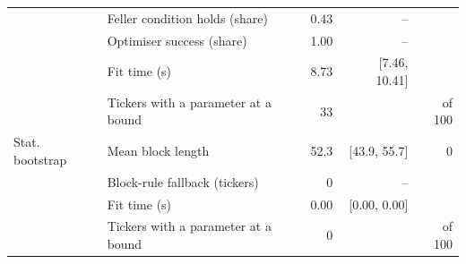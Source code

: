 \begin{tabular}{llrrr}
 & Feller condition holds (share) & 0.43 & -- &  \\
 & Optimiser success (share) & 1.00 & -- &  \\
 & Fit time (s) & 8.73 & [7.46, 10.41] &  \\
 & Tickers with a parameter at a bound & 33 &  & of 100 \\
Stat. bootstrap & Mean block length & 52.3 & [43.9, 55.7] & 0 \\
 & Block-rule fallback (tickers) & 0 & -- &  \\
 & Fit time (s) & 0.00 & [0.00, 0.00] &  \\
 & Tickers with a parameter at a bound & 0 &  & of 100 \\
\bottomrule
\end{tabular}
